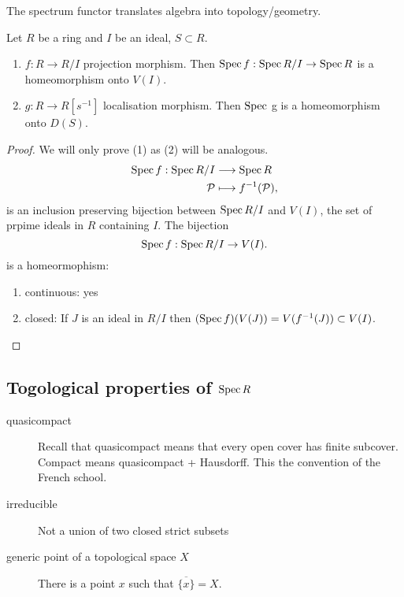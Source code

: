 The spectrum functor translates algebra into topology/geometry.
\begin{proposition}
	Let $R$ be a ring and $I$ be an ideal, $S \subset R$. 
	\begin{enumerate}
		\item $f:R \to R / I$ projection morphism. 
			Then $\operatorname{Spec} f: \operatorname{Spec} R / I \to \operatorname{Spec} R$ is a homeomorphism onto $V(I)$. 
		\item $g: R \to R[s^{-1}]$ localisation morphism. 
			Then $\operatorname{Spec}$ g is a homeomorphism onto $D(S)$. 
	\end{enumerate}
\end{proposition}
\begin{proof}
	We will only prove (1) as  (2) will be analogous.
	\begin{align*}
		\operatorname{Spec} f: \operatorname{Spec} R /I  &\longrightarrow \operatorname{Spec} R \\
		\mathcal{P}  &\longmapsto f^{-1}(\mathcal{P} )
	,\end{align*}
	is an inclusion preserving bijection between $\operatorname{Spec} R / I$ and $V(I)$, the set of prpime ideals in $R$ containing $I$. 
	The bijection \[
		\operatorname{Spec} f: \operatorname{Spec} R / I \to V(I)
	.\] 
	is a homeormophism:
	\begin{enumerate}
		\item continuous: yes
		\item closed: If $J$ is an ideal in $R / I$ then $(\operatorname{Spec} f)(V(J)) =  V(f^{-1}(J)) \subset  V(I)$. 
	\end{enumerate}
\end{proof}

\subsection{Togological properties of $\operatorname{Spec} R$} \label{sec:togological_properties_of_$\spec_r$}
\begin{recall}
	\begin{description}
	
	\item [quasicompact]	Recall that quasicompact means that every open cover has finite subcover. 
	Compact means quasicompact + Hausdorff. This the convention of the French school. 

\item [irreducible] Not a union of two closed strict subsets
\item [generic point of a topological space $X$ ] There is a point $x$ such that $\overline{\{x\} } = X$. 
\end{description}
\end{recall}

